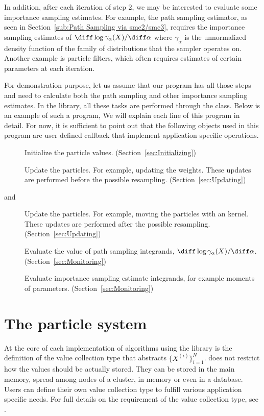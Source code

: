 In addition, after each iteration of step 2, we may be interested to evaluate
some importance sampling estimates. For example, the path sampling estimator,
as seen in Section~\ref{sub:Path Sampling via smc2/smc3}, requires the
importance sampling estimates of $\diff\log\gamma_{\alpha}(X)/\diff\alpha$
where $\gamma_{\alpha}$ is the unnormalized density function of the family of
distributions that the \smc sampler operates on. Another example is particle
filters, which often requires estimates of certain parameters at each
iteration.

For demonstration purpose, let us assume that our program has all those steps
and need to calculate both the path sampling and other importance sampling
estimates. In the \vsmc library, all these tasks are performed through the
 class. Below is an example of such a program,
We will explain each line of this program in detail. For now, it is sufficient
to point out that the following objects used in this program are user defined
callback that implement application specific operations.
\begin{description}
  \item[] Initialize the particle values.
    (Section~\ref{sec:Initializing})
  \item[] Update the particles. For example, updating the
    weights. These updates are performed before the possible resampling.
    (Section~\ref{sec:Updating})
  \item[ and ] Update the particles. For
    example, moving the particles with an \mcmc kernel. These updates are
    performed after the possible resampling. (Section~\ref{sec:Updating})
  \item[] Evaluate the value of path sampling integrands,
    $\diff\log\gamma_{\alpha}(X)/\diff\alpha$. (Section~\ref{sec:Monitoring})
  \item[] Evaluate importance sampling estimate
    integrands, for example moments of parameters.
    (Section~\ref{sec:Monitoring})
\end{description}

\section{The particle system}
\label{sec:The particle system}

At the core of each implementation of \smc algorithms using the \vsmc library
is the definition of the value collection type that abstracts
$\{X^{(i)}\}_{i=1}^N$. \vsmc does not restrict how the values should be
actually stored. They can be stored in the main memory, spread among nodes of
a cluster, in \gpu memory or even in a database. Users can define their own
value collection type to fulfill various application specific needs. For full
details on the requirement of the value collection type, see \cite{vsmcjss}.

